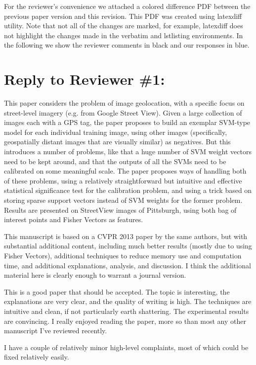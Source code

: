 \documentclass[a4paper,12pt]{article}
\begin{document}
For the reviewer’s convenience we attached a colored difference PDF between the previous paper version and this revision. This PDF was created using latexdiff utility. Note that not all of the changes are marked, for example, latexdiff does not highlight the changes made in the verbatim and lstlisting environments. In the following we show the reviewer comments in black and our responses in blue.

\section*{Reply to Reviewer \#1:} 

This paper considers the problem of image geolocation, with a specific focus on street-level imagery (e.g. from Google Street View). Given a large collection of images each with a GPS tag, the paper proposes to build an exemplar SVM-type model for each individual training image, using other images (specifically, geospatially distant images that are visually similar) as negatives. But this introduces a number of problems, like that a huge number of SVM weight vectors need to be kept around, and that the outputs of all the SVMs need to be calibrated on some meaningful scale. The paper proposes ways of handling both of these problems, using a relatively straightforward but intuitive and effective statistical significance test for the calibration problem, and using a trick based on storing sparse support vectors instead of SVM weights for the former problem. Results are presented on StreetView images of Pittsburgh, using both bag of interest points and Fisher Vectors as features.

This manuscript is based on a CVPR 2013 paper by the same authors, but with substantial additional content, including much better results (mostly due to using Fisher Vectors), additional techniques to reduce memory use and computation time, and additional explanations, analysis, and discussion. I think the additional material here is clearly enough to warrant a journal version.

This is a good paper that should be accepted. The topic is interesting, the explanations are very clear, and the quality of writing is high. The techniques are intuitive and clean, if not particularly earth shattering. The experimental results are convincing. I really enjoyed reading the paper, more so than most any other manuscript I've reviewed recently.

I have a couple of relatively minor high-level complaints, most of which could be fixed relatively easily.
\end{document}
